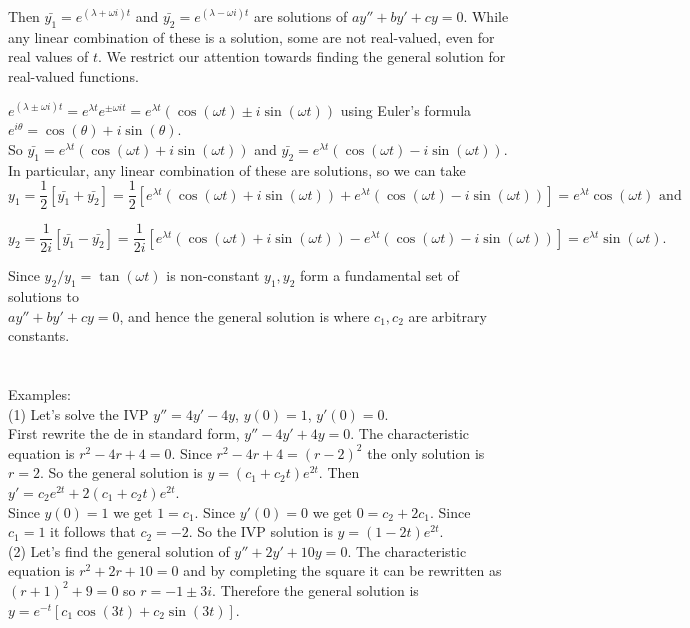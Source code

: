 \documentclass{ximera}
\begin{document}
 Then $\bar{y_1}=e^{(\lambda+ \omega i)t}$ and $\bar{y_2}=e^{(\lambda- \omega i)t}$ are solutions of $ay''+by'+cy=0$.  While any linear combination of these is a solution, some are not real-valued, even for real values of $t$. We restrict our attention towards finding the general solution for real-valued functions.

 \newpage


 $e^{(\lambda\pm \omega i)t}=e^{\lambda t}e^{\pm \omega i t}=e^{\lambda t}(\cos{(\omega t)}\pm i\sin{(\omega t)})$ using Euler's formula \\$e^{i\theta}=\cos{(\theta)}+i\sin{(\theta)}$.\\

 So $\bar{y_1}=e^{\lambda t}(\cos{(\omega t)}+ i\sin{(\omega t)})$ and $\bar{y_2}=e^{\lambda t}(\cos{(\omega t)}- i\sin{(\omega t)})$.\\

 In particular, any linear combination of these are solutions, so we can take $$y_{1}=\frac{1}{2}[\bar{y_1}+\bar{y_2}]=\frac{1}{2}\left[e^{\lambda t}(\cos{(\omega t)}+ i\sin{(\omega t)})+e^{\lambda t}(\cos{(\omega t)}- i\sin{(\omega t)})\right]=e^{\lambda t}\cos{(\omega t)}\mbox{ and }$$

$$y_{2}=\frac{1}{2i}[\bar{y_1}-\bar{y_2}]=\frac{1}{2i}\left[e^{\lambda t}(\cos{(\omega t)}+ i\sin{(\omega t)})-e^{\lambda t}(\cos{(\omega t)}- i\sin{(\omega t)})\right]=e^{\lambda t}\sin{(\omega t)}.$$

 Since $y_{2}/y_{1}=\tan{(\omega t)}$ is non-constant $y_{1},y_{2}$ form a fundamental set of solutions to\\ $ay''+by'+cy=0$, and hence the general solution is  where $c_1,c_2$ are arbitrary constants.\\ \\ \\


 Examples: \\

 (1) Let's solve the IVP $y''=4y'-4y$, $y(0)=1$, $y'(0)=0$.\\

 First rewrite the de in standard form, $y''-4y'+4y=0$.  The characteristic equation is $r^2-4r+4=0$.  Since $r^2-4r+4=(r-2)^2$ the only solution is $r=2$.  So the general solution is $y=(c_1+c_2 t)e^{2t}$.  Then $y'=c_2 e^{2t}+2(c_1+c_2 t)e^{2t}$.\\

 Since $y(0)=1$ we get $1=c_1$.  Since $y'(0)=0$ we get $0=c_2+2c_1$.  Since $c_1=1$ it follows that $c_2=-2$.  So the IVP solution is $y=(1-2t)e^{2t}$.\\

 (2) Let's find the general solution of $y''+2y'+10y=0$.  The characteristic equation is $r^2+2r+10=0$ and by completing the square it can be rewritten as $(r+1)^2+9=0$ so $r=-1\pm 3i$.   Therefore the general solution is $y=e^{-t}\left[c_1 \cos{(3t)}+c_2 \sin{(3t)}\right]$.
\end{document}
